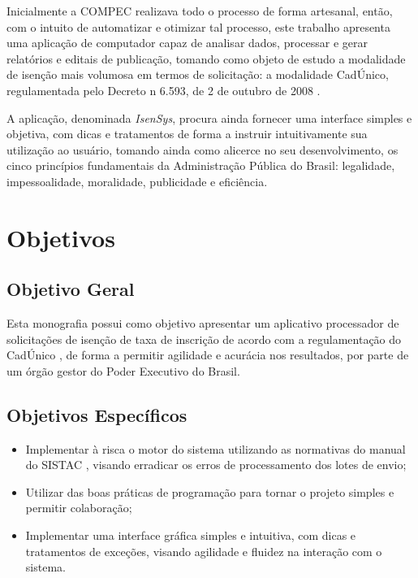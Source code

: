 \documentclass[
	12pt,			%
	openright,		%
	oneside,	
	a4paper,		%
	english,		%
	brazil			%
]{abntex2/abntex2}  %
\begin{document}
		Inicialmente a COMPEC realizava todo o processo de forma artesanal, então, com o intuito de automatizar e otimizar tal processo, este trabalho apresenta uma aplicação de computador capaz de analisar dados, processar e gerar relatórios e editais de publicação, tomando como objeto de estudo a modalidade de isenção mais volumosa em termos de solicitação: a modalidade CadÚnico, regulamentada pelo Decreto n{\textdegree} 6.593, de 2 de outubro de 2008 \cite{cadunico-decreto}.
		
		A aplicação, denominada \textit{IsenSys}, procura ainda fornecer uma interface simples e objetiva, com dicas e tratamentos de forma a instruir intuitivamente sua utilização ao usuário, tomando ainda como alicerce no seu desenvolvimento, os cinco princípios fundamentais da Administração Pública do Brasil: legalidade, impessoalidade, moralidade, publicidade e eficiência.

		\section{Objetivos}
		
			\subsection{Objetivo Geral}
			
			Esta monografia possui como objetivo apresentar um aplicativo processador de solicitações de isenção de taxa de inscrição de acordo com a regulamentação do CadÚnico \cite{cadunico-decreto}, de forma a permitir agilidade e acurácia nos resultados, por parte de um órgão gestor do Poder Executivo do Brasil.
			
			\subsection{Objetivos Específicos}
			
			\begin{itemize}
				
				\item Implementar à risca o motor do sistema utilizando as normativas do manual do SISTAC \cite{sistac-formatos}, visando erradicar os erros de processamento dos lotes de envio;
				\item Utilizar das boas práticas de programação para tornar o projeto simples e permitir colaboração;
				\item Implementar uma interface gráfica simples e intuitiva, com dicas e tratamentos de exceções, visando agilidade e fluidez na interação com o sistema.
				
			\end{itemize}
		
\end{document}
